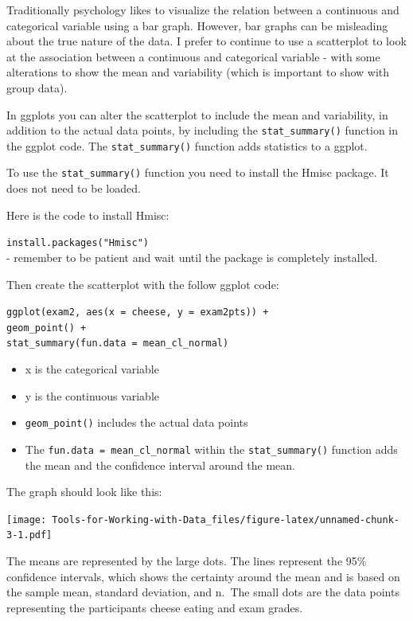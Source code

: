 \documentclass[
]{book}
\providecommand{\tightlist}{%
  \setlength{\itemsep}{0pt}\setlength{\parskip}{0pt}}
\begin{document}
Traditionally psychology likes to visualize the relation between a continuous and categorical variable using a bar graph. However, bar graphs can be misleading about the true nature of the data. I prefer to continue to use a scatterplot to look at the association between a continuous and categorical variable - with some alterations to show the mean and variability (which is important to show with group data).

In ggplots you can alter the scatterplot to include the mean and variability, in addition to the actual data points, by including the \texttt{stat\_summary()} function in the ggplot code. The \texttt{stat\_summary()} function adds statistics to a ggplot.

To use the \texttt{stat\_summary()} function you need to install the Hmisc package. It does not need to be loaded.

Here is the code to install Hmisc:

\texttt{install.packages("Hmisc")}\\
- remember to be patient and wait until the package is completely installed.

Then create the scatterplot with the follow ggplot code:

\texttt{ggplot(exam2,\ aes(x\ =\ cheese,\ y\ =\ exam2pts))\ +}\\
\texttt{geom\_point()\ +}~\\
\texttt{stat\_summary(fun.data\ =\ mean\_cl\_normal)}

\begin{itemize}
\tightlist
\item
  x is the categorical variable\\
\item
  y is the continuous variable\\
\item
  \texttt{geom\_point()} includes the actual data points\\
\item
  The \texttt{fun.data\ =\ mean\_cl\_normal} within the \texttt{stat\_summary()} function adds the mean and the confidence interval around the mean.
\end{itemize}

The graph should look like this:

\texttt{[image: Tools-for-Working-with-Data\_files/figure-latex/unnamed-chunk-3-1.pdf]}

The means are represented by the large dots. The lines represent the 95\% confidence intervals, which shows the certainty around the mean and is based on the sample mean, standard deviation, and n.~The small dots are the data points representing the participants cheese eating and exam grades.
\end{document}
